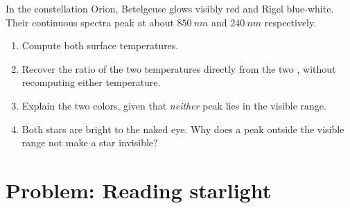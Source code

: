 \begin{exercise}[$\star\star\star$]\label{exo:g10:light-spectra:15}
In the constellation Orion, Betelgeuse glows visibly red and Rigel
blue-white. Their continuous spectra peak at about $\qty{850}{nm}$ and
$\qty{240}{nm}$ respectively.
\begin{enumerate}
  \item Compute both surface temperatures.
  \item Recover the ratio of the two temperatures directly from the two
        , without recomputing either temperature.
  \item Explain the two colors, given that \emph{neither} peak lies in
        the visible range.
  \item Both stars are bright to the naked eye. Why does a peak outside
        the visible range not make a star invisible?
\end{enumerate}
\end{exercise}

\section{Problem: Reading starlight}

